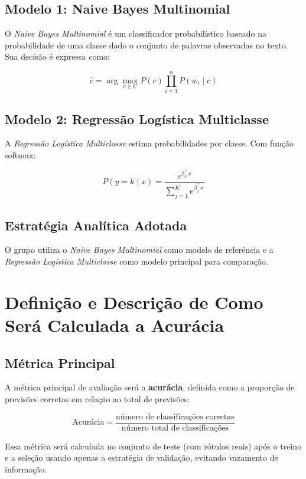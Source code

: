 \subsection{Modelo 1: Naive Bayes Multinomial}

O \textit{Naive Bayes Multinomial} é um classificador probabilístico baseado na probabilidade de uma classe dado o conjunto de palavras observadas no texto. Sua decisão é expressa como:

\[
\hat{c} = \arg\max_{c \in C} P(c)\prod_{i=1}^{n}P(w_i \mid c)
\]

\subsection{Modelo 2: Regressão Logística Multiclasse}

A \textit{Regressão Logística Multiclasse} estima probabilidades por classe. Com função softmax:

\[
P(y = k \mid x) = \frac{e^{\beta_k^\top x}}{\sum_{j=1}^{K} e^{\beta_j^\top x}}
\]

\subsection{Estratégia Analítica Adotada}

O grupo utiliza o \textit{Naive Bayes Multinomial} como modelo de referência e a \textit{Regressão Logística Multiclasse} como modelo principal para comparação.

\clearpage
\section{Definição e Descrição de Como Será Calculada a Acurácia}

\subsection{Métrica Principal}

A métrica principal de avaliação será a \textbf{acurácia}, definida como a proporção de previsões corretas em relação ao total de previsões:

\[
\text{Acurácia} = \frac{\text{número de classificações corretas}}{\text{número total de classificações}}
\]

Essa métrica será calculada no conjunto de teste (com rótulos reais) após o treino e a seleção usando apenas a estratégia de validação, evitando vazamento de informação.

